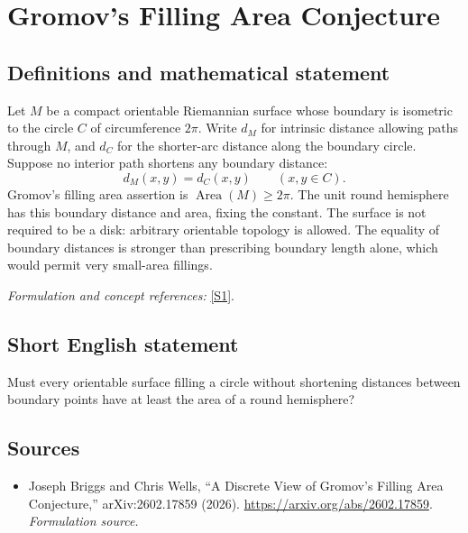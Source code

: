 \documentclass[11pt]{article}
\begin{document}
\section*{\texorpdfstring{Gromov's Filling Area Conjecture}{Gromov's Filling Area Conjecture}}\label{384}
\subsection{Definitions and mathematical statement}
Let $M$ be a compact orientable Riemannian surface whose boundary is isometric to the circle $C$ of circumference $2\pi$. Write $d_M$ for intrinsic distance allowing paths through $M$, and $d_C$ for the shorter-arc distance along the boundary circle. Suppose no interior path shortens any boundary distance:
\[
 d_M(x,y)=d_C(x,y)\qquad(x,y\in C).
\]
Gromov's filling area assertion is $\operatorname{Area}(M)\ge2\pi$. The unit round hemisphere has this boundary distance and area, fixing the constant. The surface is not required to be a disk: arbitrary orientable topology is allowed. The equality of boundary distances is stronger than prescribing boundary length alone, which would permit very small-area fillings.
\par\smallskip\textit{Formulation and concept references:} \href{https://arxiv.org/abs/2602.17859}{[S1]}.

\subsection{Short English statement}
Must every orientable surface filling a circle without shortening distances between boundary points have at least the area of a round hemisphere?
\subsection{Sources}
\begin{itemize}
\item[S1]Joseph Briggs and Chris Wells, “A Discrete View of Gromov's Filling Area Conjecture,” arXiv:2602.17859 (2026).
\url{https://arxiv.org/abs/2602.17859}.
\textit{Formulation source.}
\end{itemize}
\end{document}
